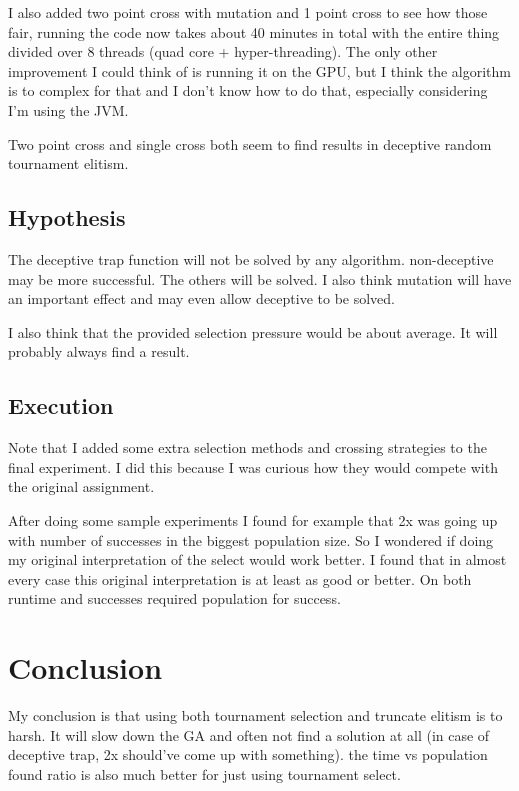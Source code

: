\documentclass{article}
\begin{document}
\begin{empfile}
I also added two point cross with mutation and 1 point cross to see how
those fair, running the code now takes about 40 minutes in total with the
entire thing divided over 8 threads (quad core + hyper-threading). The only
other improvement I could think of is running it on the GPU, but I think
the algorithm is to complex for that and I don't know how to do that,
especially considering I'm using the JVM.

Two point cross and single cross both seem to find results in deceptive
random tournament elitism.

\subsection{Hypothesis}
The deceptive trap function will not be solved by any algorithm.
non-deceptive may be more successful. The others will be solved.
I also think mutation will have an important effect and may even
allow deceptive to be solved.

I also think that the provided selection pressure would be about
average. It will probably always find a result.

\subsection{Execution}
Note that I added some extra selection methods and crossing strategies to
the final experiment. I did this because I was curious how they would
compete with the original assignment.

After doing some sample experiments I found for example that 2x was going
up with number of successes in the biggest population size. So I wondered 
if doing my original interpretation of the select would work better.
I found that in almost every case this original interpretation is at least as
good or better. On both runtime and successes required population for success.

\newpage


\section{Conclusion}
My conclusion is that using both tournament selection and truncate elitism
is to harsh. It will slow down the GA and often not find a solution at all
(in case of deceptive trap, 2x should've come up with something). the 
time vs population found ratio is also much better for just using tournament
select.


\end{empfile}
\end{document}
